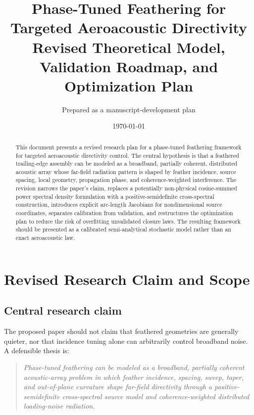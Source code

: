 \documentclass[11pt]{article}
\title{
    \textbf{Phase-Tuned Feathering for Targeted Aeroacoustic Directivity}\\
    \large Revised Theoretical Model, Validation Roadmap, and Optimization Plan
}
\author{Prepared as a manuscript-development plan}
\date{\today}
\begin{document}
\maketitle

\begin{abstract}
This document presents a revised research plan for a phase-tuned feathering framework for targeted aeroacoustic directivity control. The central hypothesis is that a feathered trailing-edge assembly can be modeled as a broadband, partially coherent, distributed acoustic array whose far-field radiation pattern is shaped by feather incidence, source spacing, local geometry, propagation phase, and coherence-weighted interference. The revision narrows the paper's claim, replaces a potentially non-physical cosine-summed power spectral density formulation with a positive-semidefinite cross-spectral construction, introduces explicit arc-length Jacobians for nondimensional source coordinates, separates calibration from validation, and restructures the optimization plan to reduce the risk of overfitting unvalidated closure laws. The resulting framework should be presented as a calibrated semi-analytical stochastic model rather than an exact aeroacoustic law.
\end{abstract}

\tableofcontents

\newpage

\section{Revised Research Claim and Scope}

\subsection{Central research claim}

The proposed paper should not claim that feathered geometries are generally quieter, nor that incidence tuning alone can arbitrarily control broadband noise. A defensible thesis is:

\begin{quote}
\emph{
Phase-tuned feathering can be modeled as a broadband, partially coherent acoustic-array problem in which feather incidence, spacing, sweep, taper, and out-of-plane curvature shape far-field directivity through a positive-semidefinite cross-spectral source model and coherence-weighted distributed loading-noise radiation.
}
\end{quote}
\end{document}
